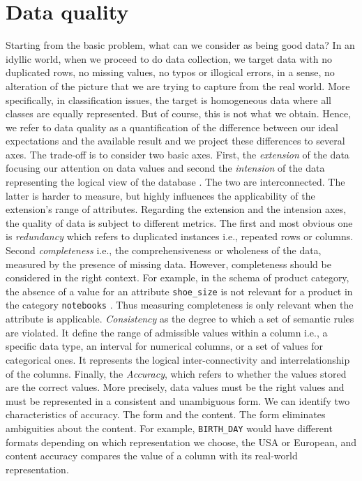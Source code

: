 \documentclass{article}
\begin{document}
\section{Data quality} %
\label{sec:Data quality}
Starting from the basic problem, what can we consider as being good data?
In an idyllic world, when we proceed to do data collection, we target data with no duplicated rows, no missing values, no typos or illogical errors, in a sense, no alteration of the picture that we are trying to capture from the real world.
More specifically, in classification issues, the target is homogeneous data where all classes are equally represented.
But of course, this is not what we obtain.
Hence, we refer to data quality as a quantification of the difference between our ideal expectations and the available result and we project these differences to several axes.
The trade-off is to consider two basic axes.
First, the \textit{extension} of the data focusing our attention on data values and second the \textit{intension} of the data representing the logical view of the database \cite{amazon}.
The two are interconnected.
The latter is harder to measure, but highly influences the applicability of the extension's range of attributes.
Regarding the extension and the intension axes, the quality of data is subject to different metrics.
The first and most obvious one is \textit{redundancy} which refers to duplicated instances i.e., repeated rows or columns.
Second \textit{completeness} i.e., the comprehensiveness or wholeness of the data, measured by the presence of missing data.
However, completeness should be considered in the right context.
For example, in the schema of product category, the absence of a value for an attribute \texttt{shoe\_size} is not relevant for a product in the category \texttt{notebooks} \cite{amazon}.
Thus measuring completeness is only relevant when the attribute is applicable.
\textit{Consistency} as the degree to which a set of semantic rules are violated.
It define the range of admissible values within a column i.e., a specific data type, an interval for numerical columns, or a set of values for categorical ones.
It represents the logical inter-connectivity and interrelationship of the columns.
Finally, the \textit{Accuracy}, which refers to whether the values stored are the correct values.
More precisely, data values must be the right values and must be represented in a consistent and unambiguous form.
We can identify two characteristics of accuracy.
The form and the content.
The form eliminates ambiguities about the content.
For example, \texttt{BIRTH\_DAY} would have different formats depending on which representation we choose, the USA or European, and content accuracy compares the value of a column with its real-world representation.
\end{document}

